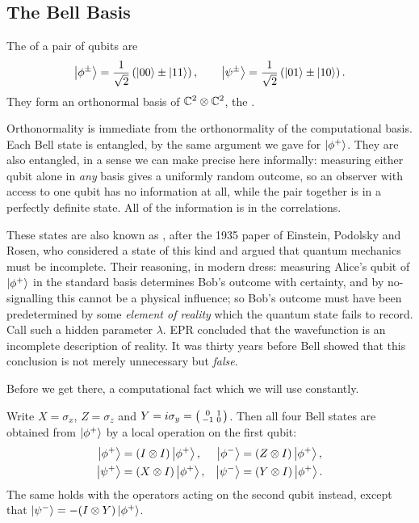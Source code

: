 \documentclass[a4paper]{scrartcl}
\begin{document}
\subsection{The Bell Basis}\label{sec:bellbasis}

\begin{definition}
	The  of a pair of qubits are
	$$\ket{\phi^\pm} = \frac{1}{\sqrt2}\left(\ket{00}\pm\ket{11}\right), \qquad \ket{\psi^\pm} = \frac{1}{\sqrt2}\left(\ket{01}\pm\ket{10}\right).$$
	They form an orthonormal basis of $\mathbb{C}^2\otimes\mathbb{C}^2$, the .
\end{definition}

Orthonormality is immediate from the orthonormality of the computational basis. Each Bell state is entangled, by the same argument we gave for $\ket{\phi^+}$. They are also  entangled, in a sense we can make precise here informally: measuring either qubit alone in \emph{any} basis gives a uniformly random outcome, so an observer with access to one qubit has no information at all, while the pair together is in a perfectly definite state. All of the information is in the correlations.

These states are also known as , after the 1935 paper of Einstein, Podolsky and Rosen, who considered a state of this kind and argued that quantum mechanics must be incomplete. Their reasoning, in modern dress: measuring Alice's qubit of $\ket{\phi^+}$ in the standard basis determines Bob's outcome with certainty, and by no-signalling this cannot be a physical influence; so Bob's outcome must have been predetermined by some \emph{element of reality} which the quantum state fails to record. Call such a hidden parameter $\lambda$. EPR concluded that the wavefunction is an incomplete description of reality. It was thirty years before Bell showed that this conclusion is not merely unnecessary but \emph{false}.

Before we get there, a computational fact which we will use constantly.

\begin{proposition}
	Write $X = \sigma_x$, $Z = \sigma_z$ and $Y = i\sigma_y = \begin{psmallmatrix} 0 & 1 \\ -1 & 0\end{psmallmatrix}$. Then all four Bell states are obtained from $\ket{\phi^+}$ by a local operation on the first qubit:
	\begin{align*}
		\ket{\phi^+} &= (I\otimes I)\ket{\phi^+}, & \ket{\phi^-} &= (Z\otimes I)\ket{\phi^+},\\
		\ket{\psi^+} &= (X\otimes I)\ket{\phi^+}, & \ket{\psi^-} &= (Y\otimes I)\ket{\phi^+}.
	\end{align*}
	The same holds with the operators acting on the second qubit instead, except that $\ket{\psi^-} = -(I\otimes Y)\ket{\phi^+}$.
\end{proposition}
\end{document}
